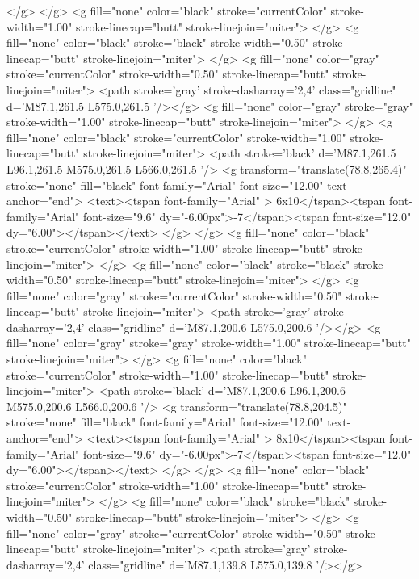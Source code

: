 	</g>
</g>
<g fill="none" color="black" stroke="currentColor" stroke-width="1.00" stroke-linecap="butt" stroke-linejoin="miter">
</g>
<g fill="none" color="black" stroke="black" stroke-width="0.50" stroke-linecap="butt" stroke-linejoin="miter">
</g>
<g fill="none" color="gray" stroke="currentColor" stroke-width="0.50" stroke-linecap="butt" stroke-linejoin="miter">
	<path stroke='gray' stroke-dasharray='2,4' class="gridline"  d='M87.1,261.5 L575.0,261.5  '/></g>
<g fill="none" color="gray" stroke="gray" stroke-width="1.00" stroke-linecap="butt" stroke-linejoin="miter">
</g>
<g fill="none" color="black" stroke="currentColor" stroke-width="1.00" stroke-linecap="butt" stroke-linejoin="miter">
	<path stroke='black'  d='M87.1,261.5 L96.1,261.5 M575.0,261.5 L566.0,261.5  '/>	<g transform="translate(78.8,265.4)" stroke="none" fill="black" font-family="Arial" font-size="12.00"  text-anchor="end">
		<text><tspan font-family="Arial" > 6x10</tspan><tspan font-family="Arial"  font-size="9.6" dy="-6.00px">-7</tspan><tspan font-size="12.0" dy="6.00"></tspan></text>
	</g>
</g>
<g fill="none" color="black" stroke="currentColor" stroke-width="1.00" stroke-linecap="butt" stroke-linejoin="miter">
</g>
<g fill="none" color="black" stroke="black" stroke-width="0.50" stroke-linecap="butt" stroke-linejoin="miter">
</g>
<g fill="none" color="gray" stroke="currentColor" stroke-width="0.50" stroke-linecap="butt" stroke-linejoin="miter">
	<path stroke='gray' stroke-dasharray='2,4' class="gridline"  d='M87.1,200.6 L575.0,200.6  '/></g>
<g fill="none" color="gray" stroke="gray" stroke-width="1.00" stroke-linecap="butt" stroke-linejoin="miter">
</g>
<g fill="none" color="black" stroke="currentColor" stroke-width="1.00" stroke-linecap="butt" stroke-linejoin="miter">
	<path stroke='black'  d='M87.1,200.6 L96.1,200.6 M575.0,200.6 L566.0,200.6  '/>	<g transform="translate(78.8,204.5)" stroke="none" fill="black" font-family="Arial" font-size="12.00"  text-anchor="end">
		<text><tspan font-family="Arial" > 8x10</tspan><tspan font-family="Arial"  font-size="9.6" dy="-6.00px">-7</tspan><tspan font-size="12.0" dy="6.00"></tspan></text>
	</g>
</g>
<g fill="none" color="black" stroke="currentColor" stroke-width="1.00" stroke-linecap="butt" stroke-linejoin="miter">
</g>
<g fill="none" color="black" stroke="black" stroke-width="0.50" stroke-linecap="butt" stroke-linejoin="miter">
</g>
<g fill="none" color="gray" stroke="currentColor" stroke-width="0.50" stroke-linecap="butt" stroke-linejoin="miter">
	<path stroke='gray' stroke-dasharray='2,4' class="gridline"  d='M87.1,139.8 L575.0,139.8  '/></g>
